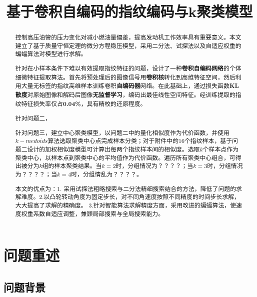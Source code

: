 \documentclass{whutmod}
\title{基于卷积自编码的指纹编码与k聚类模型}
\newcommand{\upcite}[1]{\textsuperscript{\cite{#1}}}
\begin{document}
	\maketitle
	\thispagestyle{empty}
	\begin{abstract}
		控制高压油管的压力变化对减小燃油量偏差，提高发动机工作效率具有重要意义。本文建立了基于质量守恒定理的微分方程稳压模型，采用二分法、试探法以及自适应权重的蝙蝠算法对模型进行求解。

	
		
		针对在小样本条件下难以有效提取指纹特征的问题，设计了一种\textbf{卷积自编码网络}的个体细微特征提取算法。首先将预处理后的图像信号用\textbf{卷积核}转化到高维特征空间，然后利用大量无标签的指纹高维样本训练卷积\textbf{自编码器}网络。在此基础上，通过损失函数\textbf{KL散度}对原始图像和解码后图像\textbf{无监督学习}，编码出最佳线性空间特征。经训练提取的指纹特征损失率仅占\textbf{0.04\%}，具有精校的还原程度。
		
		
		针对问题二，
		
		针对问题三，建立中心聚类模型，以问题二中的量化相似度作为代价函数，并使用$k-medoids$算法选取聚类中心点完成样本分类；对于附件中的$16$个指纹样本，基于问题二设计的加权相似度模型可计算出每两个指纹样本间的相似度。选取$k$个样本点作为聚类中心，以样本点到聚类中心的平均值作为代价函数。遍历所有聚类中心组合，可得出被分为$k$组的样本聚类结果。当$k=2$时，分组情况为？？？？；当$k=3$时，分组情况为？？？？；当$k=4$时，分组情乱为？？？？。
		
		
		本文的优点为：1. 采用试探法粗略搜索与二分法精细搜索结合的方法，降低了问题的求解难度。2.以凸轮转动角度为固定步长，对不同角速度按照不同精度的时间步长求解，大大提高了求解的精确度。 3.针对智能算法求解精度方面，采用改进的蝙蝠算法，使速度权重系数自适应调整，兼顾局部搜索与全局搜索能力。
		
	\end{abstract}


	\thispagestyle{empty}
	\tableofcontents
		\thispagestyle{empty}
	\setcounter{page}{0}                                               
	\newpage	%
	

	
	\section{问题重述}	
		\subsection{问题背景}
	
\end{document}
